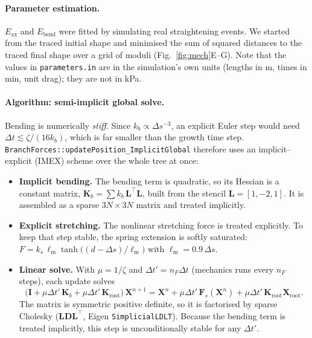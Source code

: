 \documentclass[11pt,a4paper]{article}
\newcommand{\code}[1]{\texttt{#1}}
\newcommand{\vect}[1]{\bm{#1}}
\begin{document}
\paragraph{Parameter estimation.}
$E_\text{ax}$ and $E_\text{bend}$ were fitted by simulating real straightening events. We started from the traced initial shape and minimised the sum of squared distances to the traced final shape over a grid of moduli (Fig.~\ref{fig:mech}E--G). Note that the values in \code{parameters.in} are in the simulation's own units (lengths in \textmu m, times in min, unit drag); they are not in kPa.

\paragraph{Algorithm: semi-implicit global solve.}
Bending is numerically \emph{stiff}. Since $k_b\propto\Delta s^{-3}$, an explicit Euler step would need $\Delta t\lesssim\zeta/(16k_b)$, which is far smaller than the growth time step. \code{BranchForces::\allowbreak updatePosition\_\allowbreak ImplicitGlobal} therefore uses an implicit--explicit (IMEX) scheme over the whole tree at once:
\begin{itemize}
  \item \textbf{Implicit bending.} The bending term is quadratic, so its Hessian is a constant matrix, $\mathbf K_b=\sum k_b\,\mathbf L^\top\mathbf L$, built from the stencil $\mathbf L=[1,-2,1]$. It is assembled as a sparse $3N\times3N$ matrix and treated implicitly.
  \item \textbf{Explicit stretching.} The nonlinear stretching force is treated explicitly. To keep that step stable, the spring extension is softly saturated: $F=k_s\,\ell_\text{m}\tanh\!\big((d-\Delta s)/\ell_\text{m}\big)$ with $\ell_\text{m}=0.9\,\Delta s$.
  \item \textbf{Linear solve.} With $\mu=1/\zeta$ and $\Delta t'=n_F\Delta t$ (mechanics runs every $n_F$ steps), each update solves
  \begin{equation}
    \big(\mathbf I+\mu\Delta t'\,\mathbf K_b+\mu\Delta t'\,\mathbf K_\text{root}\big)\,\vect X^{n+1}
    =\vect X^{n}+\mu\Delta t'\,\vect F_s(\vect X^{n})+\mu\Delta t'\,\mathbf K_\text{root}\vect X_\text{root}.
  \end{equation}
  The matrix is symmetric positive definite, so it is factorised by sparse Cholesky ($\mathbf{LDL}^\top$, Eigen \code{SimplicialLDLT}). Because the bending term is treated implicitly, this step is unconditionally stable for any $\Delta t'$.
\end{itemize}
\end{document}
